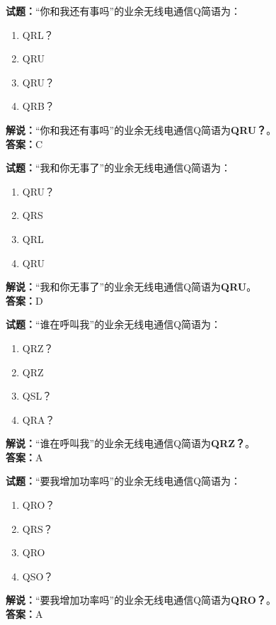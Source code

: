 \documentclass{ctexbook}
\begin{document}
\vspace{1em}

\textbf{试题：}“你和我还有事吗”的业余无线电通信Q简语为：
\begin{enumerate}[leftmargin=3em]
  \item QRL？
  \item QRU
  \item QRU？
  \item QRB？
\end{enumerate}
\noindent\textbf{解说：}“你和我还有事吗”的业余无线电通信Q简语为\textbf{QRU？}。\\\noindent\textbf{答案：}C

\vspace{1em}

\textbf{试题：}“我和你无事了”的业余无线电通信Q简语为：
\begin{enumerate}[leftmargin=3em]
  \item QRU？
  \item QRS
  \item QRL
  \item QRU
\end{enumerate}
\noindent\textbf{解说：}“我和你无事了”的业余无线电通信Q简语为\textbf{QRU}。\\\noindent\textbf{答案：}D

\vspace{1em}

\textbf{试题：}“谁在呼叫我”的业余无线电通信Q简语为：
\begin{enumerate}[leftmargin=3em]
  \item QRZ？
  \item QRZ
  \item QSL？
  \item QRA？
\end{enumerate}
\noindent\textbf{解说：}“谁在呼叫我”的业余无线电通信Q简语为\textbf{QRZ？}。\\\noindent\textbf{答案：}A

\vspace{1em}

\textbf{试题：}“要我增加功率吗”的业余无线电通信Q简语为：
\begin{enumerate}[leftmargin=3em]
  \item QRO？
  \item QRS？
  \item QRO
  \item QSO？
\end{enumerate}
\noindent\textbf{解说：}“要我增加功率吗”的业余无线电通信Q简语为\textbf{QRO？}。\\\noindent\textbf{答案：}A
\end{document}

